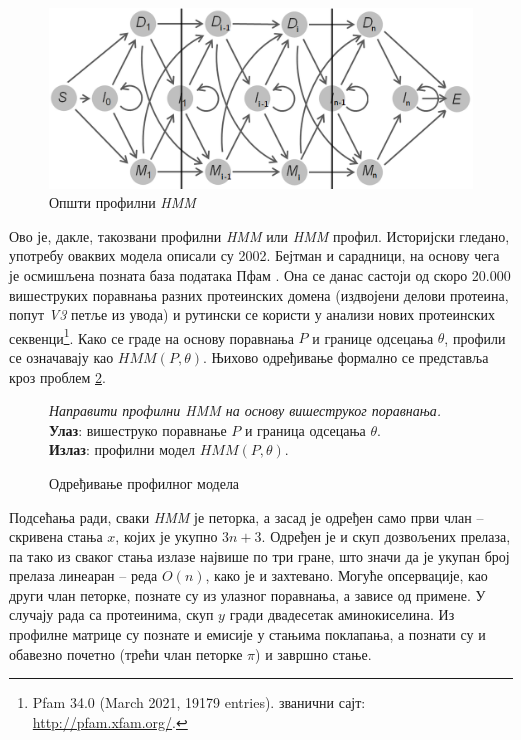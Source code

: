 \documentclass[12pt,oneside]{memoir}
\newenvironment{problem}[1][!ht]
{\renewcommand{\algorithmcfname}{Проблем}
\begin{figure}[!ht]
\centering
  \begin{minipage}{.94\linewidth}
	\begin{algorithm}[#1]%
  }{\end{algorithm}
  \end{minipage}
\end{figure}}
\begin{document}
\begin{CJK}{UTF8}{ipxm}
\begin{figure}[H]
  \centering
  \includegraphics[width=.95\textwidth]{prof_hmm.png}
  \caption{Општи профилни \textit{HMM}}
  \label{fig:prof_hmm}
\end{figure}

Ово је, дакле, такозвани профилни \textit{HMM} или \textit{HMM} профил. Историјски гледано, употребу оваквих модела описали су 2002. Бејтман и сарадници, на основу чега је осмишљена позната база података Пфам \cite{bateman2002}. Она се данас састоји од скоро 20.000 вишеструких поравнања разних протеинских домена (издвојени делови протеина, попут \textit{V3} петље из увода) и рутински се користи у анализи нових протеинских секвенци\footnote{Pfam 34.0 (March 2021, 19179 entries). званични сајт: \url{http://pfam.xfam.org/}.}. Како се граде на основу поравнања $P$ и границе одсецања $\theta$, профили се означавају као $HMM(P, \theta)$. Њихово одређивање формално се представља кроз проблем \ref{prob:prof}.

\begin{problem}[H]
  \SetAlgoLined
  \textit{Направити профилни \textit{HMM} на основу вишеструког поравнања.}\\
  \textbf{Улаз}: вишеструко поравнање $P$ и граница одсецања $\theta$.\\
  \textbf{Излаз}: профилни модел $HMM(P, \theta)$.
  \caption[]{Одређивање профилног модела\footnotemark}
  \label{prob:prof}
\end{problem}


Подсећања ради, сваки \textit{HMM} је петорка, а засад је одређен само први члан -- скривена стања $x$, којих је укупно $3n+3$. Одређен је и скуп дозвољених прелаза, па тако из сваког стања излазе највише по три гране, што значи да је укупан број прелаза линеаран -- реда $O(n)$, како је и захтевано. Могуће опсервације, као други члан петорке, познате су из улазног поравнања, а зависе од примене. У случају рада са протеинима, скуп $y$ гради двадесетак аминокиселина. Из профилне матрице су познате и емисије у стањима поклапања, а познати су и обавезно почетно (трећи члан петорке $\pi$) и завршно стање.


\end{CJK}
\end{document}
